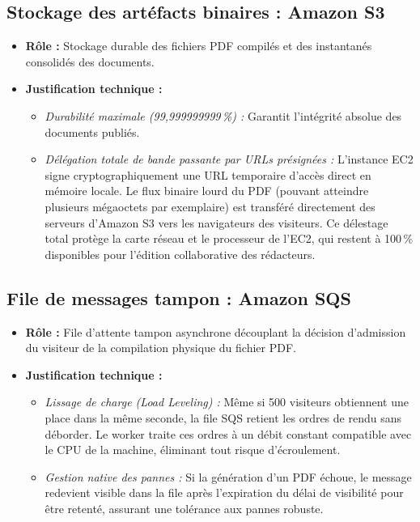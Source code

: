 \subsection{Stockage des artéfacts binaires : Amazon S3}
\begin{itemize}
    \item \textbf{Rôle :} Stockage durable des fichiers PDF compilés et des instantanés consolidés des documents.
    \item \textbf{Justification technique :} 
    \begin{itemize}
        \item \emph{Durabilité maximale (99,999999999\,\%) :} Garantit l'intégrité absolue des documents publiés.
        \item \emph{Délégation totale de bande passante par URLs présignées :} L'instance EC2 signe cryptographiquement une URL temporaire d'accès direct en mémoire locale. Le flux binaire lourd du PDF (pouvant atteindre plusieurs mégaoctets par exemplaire) est transféré directement des serveurs d'Amazon S3 vers les navigateurs des visiteurs. Ce délestage total protège la carte réseau et le processeur de l'EC2, qui restent à 100\,\% disponibles pour l'édition collaborative des rédacteurs.
    \end{itemize}
\end{itemize}

\subsection{File de messages tampon : Amazon SQS}
\begin{itemize}
    \item \textbf{Rôle :} File d'attente tampon asynchrone découplant la décision d'admission du visiteur de la compilation physique du fichier PDF.
    \item \textbf{Justification technique :} 
    \begin{itemize}
        \item \emph{Lissage de charge (Load Leveling) :} Même si 500 visiteurs obtiennent une place dans la même seconde, la file SQS retient les ordres de rendu sans déborder. Le worker traite ces ordres à un débit constant compatible avec le CPU de la machine, éliminant tout risque d'écroulement.
        \item \emph{Gestion native des pannes :} Si la génération d'un PDF échoue, le message redevient visible dans la file après l'expiration du délai de visibilité pour être retenté, assurant une tolérance aux pannes robuste.
    \end{itemize}
\end{itemize}

